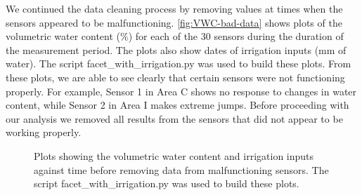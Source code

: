 \documentclass[12pt]{scrartcl}
\begin{document}
We continued the data cleaning process by removing values at times when the sensors appeared to be malfunctioning. \autoref{fig:VWC-bad-data} shows plots of the volumetric water content (\%) for each of the 30 sensors during the duration of the measurement period. The plots also show dates of irrigation inputs (mm of water). The script facet\_with\_irrigation.py was used to build these plots. From these plots, we are able to see clearly that certain sensors were not functioning properly. For example, Sensor 1 in Area C shows no response to changes in water content, while Sensor 2 in Area I makes extreme jumps. Before proceeding with our analysis we removed all results from the sensors that did not appear to be working properly.

\begin{figure}[!htb]
        \caption{\label{fig:VWC-bad-data} Plots showing the volumetric water content and irrigation inputs against time before removing data from malfunctioning sensors. The script facet\_with\_irrigation.py was used to build these plots.}
\end{figure}
\end{document}
